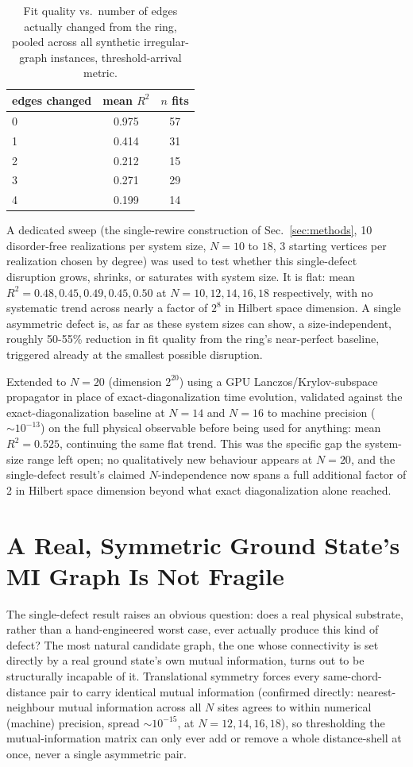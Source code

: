 \documentclass[11pt]{article}
\begin{document}
\begin{table}[h]
\centering
\caption{Fit quality vs.\ number of edges actually changed from the ring, pooled across all synthetic irregular-graph instances, threshold-arrival metric.}
\label{tab:cliff}
\begin{tabular}{@{}lcc@{}}
\toprule
edges changed & mean $R^2$ & $n$ fits \\
\midrule
0 & 0.975 & 57 \\
1 & 0.414 & 31 \\
2 & 0.212 & 15 \\
3 & 0.271 & 29 \\
4 & 0.199 & 14 \\
\bottomrule
\end{tabular}
\end{table}

A dedicated sweep (the single-rewire construction of Sec.~\ref{sec:methods}, 10 disorder-free realizations per system size, $N=10$ to $18$, 3 starting vertices per realization chosen by degree) was used to test whether this single-defect disruption grows, shrinks, or saturates with system size. It is flat: mean $R^2=0.48, 0.45, 0.49, 0.45, 0.50$ at $N=10,12,14,16,18$ respectively, with no systematic trend across nearly a factor of $2^8$ in Hilbert space dimension. A single asymmetric defect is, as far as these system sizes can show, a size-independent, roughly 50-55\% reduction in fit quality from the ring's near-perfect baseline, triggered already at the smallest possible disruption.

Extended to $N=20$ (dimension $2^{20}$) using a GPU Lanczos/Krylov-subspace propagator in place of exact-diagonalization time evolution, validated against the exact-diagonalization baseline at $N=14$ and $N=16$ to machine precision ($\sim10^{-13}$) on the full physical observable before being used for anything: mean $R^2=0.525$, continuing the same flat trend. This was the specific gap the system-size range left open; no qualitatively new behaviour appears at $N=20$, and the single-defect result's claimed $N$-independence now spans a full additional factor of 2 in Hilbert space dimension beyond what exact diagonalization alone reached.

\section{A Real, Symmetric Ground State's MI Graph Is Not Fragile}
\label{sec:symmetric}

The single-defect result raises an obvious question: does a real physical substrate, rather than a hand-engineered worst case, ever actually produce this kind of defect? The most natural candidate graph, the one whose connectivity is set directly by a real ground state's own mutual information, turns out to be structurally incapable of it. Translational symmetry forces every same-chord-distance pair to carry identical mutual information (confirmed directly: nearest-neighbour mutual information across all $N$ sites agrees to within numerical (machine) precision, spread $\sim10^{-15}$, at $N=12,14,16,18$), so thresholding the mutual-information matrix can only ever add or remove a whole distance-shell at once, never a single asymmetric pair.
\end{document}
